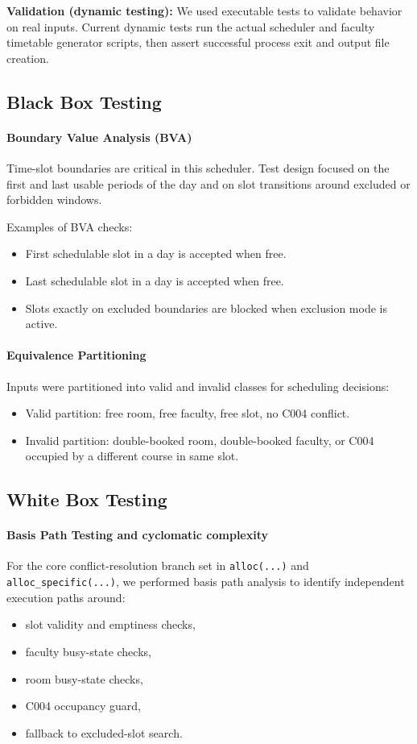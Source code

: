 \documentclass[12pt,a4paper]{article}
\begin{document}
\textbf{Validation (dynamic testing):}
We used executable tests to validate behavior on real inputs. Current dynamic tests run the actual scheduler and faculty timetable generator scripts, then assert successful process exit and output file creation.

\subsection{Black Box Testing}

\paragraph{Boundary Value Analysis (BVA)}
Time-slot boundaries are critical in this scheduler. Test design focused on the first and last usable periods of the day and on slot transitions around excluded or forbidden windows.

Examples of BVA checks:
\begin{itemize}[leftmargin=1.2cm]
  \item First schedulable slot in a day is accepted when free.
  \item Last schedulable slot in a day is accepted when free.
  \item Slots exactly on excluded boundaries are blocked when exclusion mode is active.
\end{itemize}

\paragraph{Equivalence Partitioning}
Inputs were partitioned into valid and invalid classes for scheduling decisions:
\begin{itemize}[leftmargin=1.2cm]
  \item Valid partition: free room, free faculty, free slot, no C004 conflict.
  \item Invalid partition: double-booked room, double-booked faculty, or C004 occupied by a different course in same slot.
\end{itemize}

\subsection{White Box Testing}

\paragraph{Basis Path Testing and cyclomatic complexity}
For the core conflict-resolution branch set in \texttt{alloc(...)} and \texttt{alloc\_specific(...)}, we performed basis path analysis to identify independent execution paths around:
\begin{itemize}[leftmargin=1.2cm]
  \item slot validity and emptiness checks,
  \item faculty busy-state checks,
  \item room busy-state checks,
  \item C004 occupancy guard,
  \item fallback to excluded-slot search.
\end{itemize}
\end{document}
